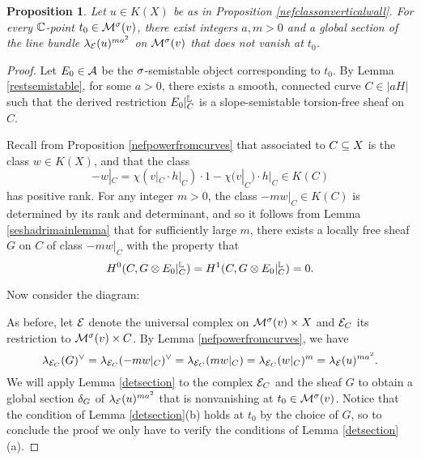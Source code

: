 \documentclass[letterpaper,12pt]{amsart}
\newtheorem{prop}[thm]{Proposition}
\theoremstyle{remark}
\begin{document}
\begin{prop}\label{globalgen}
    Let $u \in K(X)$ be as in Proposition \ref{nefclassonverticalwall}. For every $\mathbb{C}$-point $t_0 \in \mathcal{M}^\sigma(v)$, there exist integers $a, m > 0$ and a global section of the line bundle $\lambda_{\mathcal{E}}(u)^{m a^2}$ on $\mathcal{M}^\sigma(v)$ that does not vanish at $t_0$.
\end{prop}
\begin{proof}
    Let $E_0 \in \mathcal{A}$ be the $\sigma$-semistable object corresponding to $t_0$. By Lemma \ref{restsemistable}, for some $a > 0$, there exists a smooth, connected curve $C \in |a H|$ such that the derived restriction $E_0|_C^{\mathbb{L}}$ is a slope-semistable torsion-free sheaf on $C$.
    
    Recall from Proposition \ref{nefpowerfromcurves} that associated to $C \subseteq X$ is the class $w \in K(X)$, and that the class 
    \[ -w|_C = \chi(v|_C \cdot h|_C) \cdot 1 - \chi(v|_C) \cdot h|_C \in K(C) \] 
    has positive rank. For any integer $m > 0$, the class $-m w|_C \in K(C)$ is determined by its rank and determinant, and so it follows from Lemma \ref{seshadrimainlemma} that for sufficiently large $m$, there exists a locally free sheaf $G$ on $C$ of class $-m w|_C$ with the property that
    \[ H^0(C, G \otimes E_0|_C^{\mathbb{L}}) = H^1(C, G \otimes E_0|_C^{\mathbb{L}}) = 0. \]
    
    Now consider the diagram:
    \begin{center}
    \end{center}
    As before, let $\mathcal{E}$ denote the universal complex on $\mathcal{M}^\sigma(v) \times X$ and $\mathcal{E}_C$ its restriction to $\mathcal{M}^\sigma(v) \times C$. By Lemma \ref{nefpowerfromcurves}, we have
    \[ \lambda_{\mathcal{E}_C}(G)^\vee = \lambda_{\mathcal{E}_C}(-m w|_C)^\vee = \lambda_{\mathcal{E}_C}(m w|_C) = \lambda_{\mathcal{E}_C}(w|_C)^m = \lambda_{\mathcal{E}}(u)^{m a^2}. \]
    We will apply Lemma \ref{detsection} to the complex $\mathcal{E}_C$ and the sheaf $G$ to obtain a global section $\delta_G$ of $\lambda_{\mathcal{E}}(u)^{m a^2}$ that is nonvanishing at $t_0 \in \mathcal{M}^\sigma(v)$. Notice that the condition of Lemma \ref{detsection}(b) holds at $t_0$ by the choice of $G$, so to conclude the proof we only have to verify the conditions of Lemma \ref{detsection}(a).
    

\end{proof}
\end{document}
